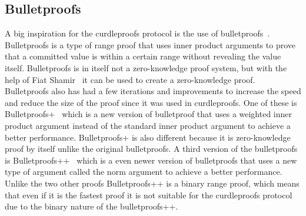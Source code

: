 \subsection{Bulletproofs}\label{sec:related-work-bulletproofs}
A big inspiration for the curdleproofs protocol is the use of bulletproofs~\cite{bunz2018bulletproofs}.
Bulletproofs is a type of range proof that uses inner product arguments to prove that a committed value is within a certain range without revealing the value itself.
Bulletproofs is in itself not a zero-knowledge proof system, but with the help of Fiat Shamir~\cite{bunz2018bulletproofs} it can be used to create a zero-knowledge proof.
Bulletproofs also has had a few iterations and improvements to increase the speed and reduce the size of the proof since it was used in curdleproofs.
One of these is Bulletproofs+~\cite{chung2022bulletproofs+} which is a new version of bulletproof that uses a weighted inner product argument instead of the standard inner product argument to achieve a better performance.
Bulletproofs+ is also different because it is zero-knowledge proof by itself unlike the original bulletproofs.
A third version of the bulletproofs is Bulletproofs++~\cite{eagen2024bulletproofs++} which is a even newer version of bulletproofs that uses a new type of argument called the norm argument to achieve a better performance.
Unlike the two other proofs Bulletproofs++ is a binary range proof, which means that even if it is the fastest proof it is not suitable for the curdleproofs protocol due to the binary nature of the bulletproofs++.